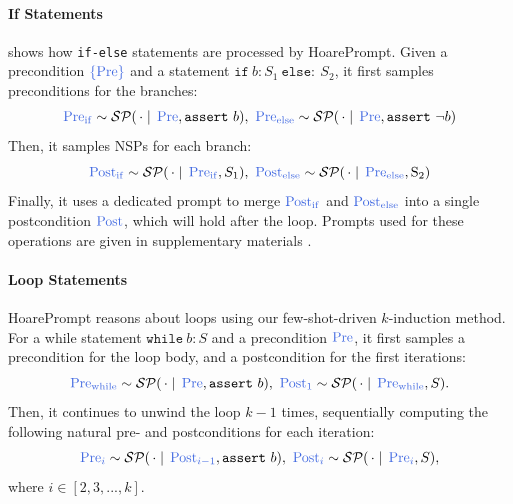 \documentclass[sigconf]{acmart}
\makeatletter
\newcommand{\projName}{HoarePrompt\xspace}
\def\mathcolor#1#{\@mathcolor{#1}}
\def\@mathcolor#1#2#3{%
  \protect\leavevmode
  \begingroup
    \color#1{#2}#3%
  \endgroup
}
\makeatother
\begin{document}

\paragraph*{If Statements}  shows how \texttt{if-else} statements are processed by \projName. Given a precondition $\mathcolor{softblue}{\{\text{Pre}\}}$ and a statement $\mathtt{if}\ b\!:S_1\ \mathtt{else}\!:\ S_2$, it first samples preconditions for the branches:
$$
\mathcolor{softblue}{\mathrm{Pre_{if}}}\sim \mathcal{SP}(\,\cdot\mid\,\mathcolor{softblue}{\mathrm{Pre}}, \mathtt{assert}\ b),\ \mathcolor{softblue}{\mathrm{Pre_{else}}}\sim \mathcal{SP}(\,\cdot\mid\,\mathcolor{softblue}{\mathrm{Pre}},  \mathtt{assert}\ \neg b)
$$
Then, it samples NSPs for each branch:
$$\mathcolor{softblue}{\mathrm{Post_{if}}}\sim \mathcal {SP}(\,\cdot\mid\,\mathcolor{softblue}{\mathrm{Pre_{if}}}, S_1),\
\mathcolor{softblue}{\mathrm{Post_{else}}}\sim \mathcal {SP}(\,\cdot\mid\,\mathcolor{softblue}{\mathrm{Pre_{else}}}, \mathrm{S_2})
$$
Finally, it uses a dedicated prompt to merge $\mathcolor{softblue}{\mathrm{Post_{if}}}$ and $\mathcolor{softblue}{\mathrm{Post_{else}}}$ into a single postcondition $\mathcolor{softblue}{\mathrm{Post}}$, which will hold after the loop. Prompts used for these operations are given in supplementary materials .

\paragraph*{Loop Statements} \projName reasons about loops using our few-shot-driven $k$-induction method. For a while statement $\mathtt{while}\ b\!: S$ and a precondition $\mathcolor{softblue}{\mathrm{Pre}}$, it first samples a precondition for the loop body, and a postcondition for the first iterations: $$\mathcolor{softblue}{\mathrm{Pre_{while}}}\sim \mathcal{SP}(\,\cdot\mid\,\mathcolor{softblue}{\mathrm{Pre}}, \mathtt{assert}\ b),\ \mathcolor{softblue}{\mathrm{Post_1}}\sim \mathcal {SP}(\,\cdot\mid\,\mathcolor{softblue}{\mathrm{Pre_{while}}}, S).$$ Then, it continues to unwind the loop $k-1$ times, sequentially computing the following natural pre- and postconditions for each iteration:
$$\mathcolor{softblue}{\mathrm{Pre}_i}\sim \mathcal{SP}(\,\cdot\mid\,\mathcolor{softblue}{\mathrm{Post}_{i-1}}, \mathtt{assert}\ b),\ \mathcolor{softblue}{\mathrm{Post}_i}\sim \mathcal {SP}(\,\cdot\mid\,\mathcolor{softblue}{\mathrm{Pre}_i}, S),$$ where $i\in[2,3,...,k]$.
\end{document}
